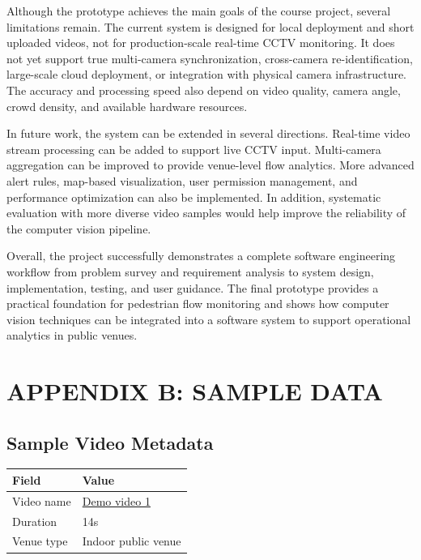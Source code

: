 \documentclass[12pt,a4paper]{report}
\begin{document}
Although the prototype achieves the main goals of the course project, several limitations remain. The current system is designed for local deployment and short uploaded videos, not for production-scale real-time CCTV monitoring. It does not yet support true multi-camera synchronization, cross-camera re-identification, large-scale cloud deployment, or integration with physical camera infrastructure. The accuracy and processing speed also depend on video quality, camera angle, crowd density, and available hardware resources.

In future work, the system can be extended in several directions. Real-time video stream processing can be added to support live CCTV input. Multi-camera aggregation can be improved to provide venue-level flow analytics. More advanced alert rules, map-based visualization, user permission management, and performance optimization can also be implemented. In addition, systematic evaluation with more diverse video samples would help improve the reliability of the computer vision pipeline.

Overall, the project successfully demonstrates a complete software engineering workflow from problem survey and requirement analysis to system design, implementation, testing, and user guidance. The final prototype provides a practical foundation for pedestrian flow monitoring and shows how computer vision techniques can be integrated into a software system to support operational analytics in public venues.

\appendix

\chapter*{APPENDIX B: SAMPLE DATA}

\section*{Sample Video Metadata}

\begin{longtable}{|p{4cm}|p{10cm}|}
\hline
\rowcolor{HeaderBlue}\textbf{Field} & \textbf{Value} \\
\hline
Video name & \href{https://drive.google.com/drive/folders/1yck6yxGl0HNDY765-ukM-afK5mTJDRr4?usp=drive_link}{Demo video 1} \\
\hline
Duration & 14s \\
\hline
Venue type & Indoor public venue \\
\hline
\end{longtable}
\end{document}
